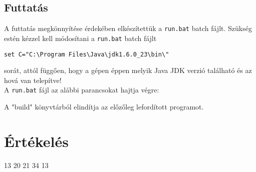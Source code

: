 \subsection{Futtatás}
A futtatás megkönnyítése érdekében elkészítettük a \texttt{run.bat} batch fájlt.
Szükség estén kézzel kell módosítani a \texttt{run.bat} batch fájlt
\begin{verbatim}
set C="C:\Program Files\Java\jdk1.6.0_23\bin\"
\end{verbatim} sorát, attól függően, hogy a gépen éppen melyik Java JDK verzió található és az hová van telepítve!\\
A \texttt{run.bat} fájl az alábbi parancsokat hajtja végre:

A "build" könyvtárból elindítja az előzőleg lefordított programot.

\section{Értékelés}

\begin{ertekeles}
{13}
{20}
{21}
{34}
{13}
\end{ertekeles}
